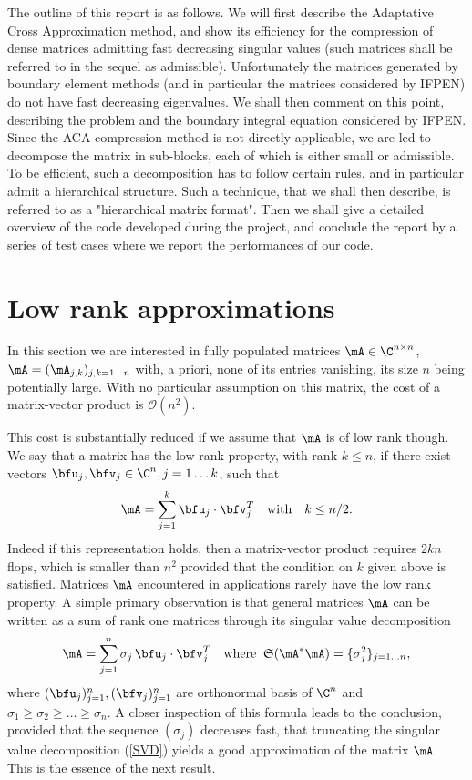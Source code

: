 \medskip
The outline of this report is as follows. We will first describe the Adaptative Cross Approximation method, and show its efficiency 
for the compression of dense matrices admitting fast decreasing singular values (such matrices shall be referred to in the sequel as admissible). 
Unfortunately the matrices generated by boundary element  methods (and in particular the matrices considered by IFPEN) do not have 
fast decreasing eigenvalues. We shall then comment on this point, describing the problem and the boundary integral equation 
considered by IFPEN. Since the ACA compression method is not directly applicable, we are led to decompose the matrix in sub-blocks, 
each of which is either small or admissible. To be efficient, such a decomposition has to follow certain rules, and in particular 
admit a hierarchical structure. Such a technique, that we shall then describe, is referred to as a "hierarchical matrix format". 
Then we shall give a detailed overview of the code developed during the project, and conclude the report by a series of test 
cases where we report the performances of our code.


\section{Low rank approximations}
\label{sec:LowRankApprox}

In this section we are interested in fully populated matrices $\mA\in \C^{n\times n}$, $\mA = (\mA_{j,k})_{j,k=1\dots n}$ with, a priori, 
none of its entries vanishing, its size $n$ being potentially large. With no particular assumption on this matrix, the cost of a 
matrix-vector product is $\mathcal{O}(n^{2})$. 

\bigskip
This cost is substantially reduced if we assume that $\mA$ is of low rank though. We say that a matrix has the low rank property, 
with rank $k\leq n$, if there exist vectors $\bfu_{j},\bfv_{j}\in \C^{n}, j=1\dots k$, such that 
$$
\mA = \sum_{j=1}^{k}\bfu_{j}\cdot\bfv_{j}^{T}\quad \textrm{with}\quad k\leq n/2.
$$ 
Indeed if this representation holds, then a matrix-vector product requires $2 k n$ flops, which is smaller than $n^{2}$ provided 
that the condition on $k$ given above is satisfied. Matrices $\mA$ encountered in applications rarely have the low rank property. 
A simple primary observation is that general matrices $\mA$ can be written as a sum of rank one matrices through its singular value
decomposition
\begin{equation}\label{SVD}
\mA = \sum_{j=1}^{n}\sigma_{j}\,\bfu_{j}\cdot\bfv_{j}^{T}\quad \textrm{where}\;\; \mathfrak{S}(\mA^{*}\mA) = \{\sigma_{j}^{2}\}_{j=1\dots n},
\end{equation}
where $(\bfu_{j})_{j=1}^{n}, (\bfv_{j})_{j=1}^{n}$ are orthonormal basis of $\C^{n}$ and $\sigma_{1}\geq \sigma_{2}\geq \dots \geq \sigma_{n}$. 
A closer inspection of this formula leads to the conclusion, provided that the sequence $(\sigma_{j})$  decreases fast, that 
truncating the singular value decomposition (\ref{SVD}) yields a good approximation of the matrix $\mA$. This is the essence of 
the next result.

